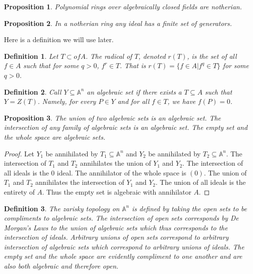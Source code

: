\documentclass{article}
\theoremstyle{problemstyle}
\newtheorem{definition}{Definition}
\newtheorem{proposition}{Proposition}
\begin{document}
\begin{proposition}
Polynomial rings over algebraically closed fields are notherian. 
\end{proposition}

\begin{proposition}
In a notherian ring any ideal has a finite set of generators. 
\end{proposition}

Here is a definition we will use later. 

\begin{definition}
Let $T \subset of A$. The radical of $T$, denoted $r(T)$, is the set of all $f \in A$ such that for some $q>0$, $f^r \in T$. That is $r(T) = \{f \in A | f^q \in T\}$ for some $q >0$.  
\end{definition}

\begin{definition}
Call $Y \subseteq \mathbb{A}^n$ an algebraic set if there exists a $T \subseteq A$ such that $Y = Z(T)$. Namely, for every $P \in Y$ and for all $f \in T$, we have $f(P) = 0$. 
\end{definition}

\begin{proposition}
The union of two algebraic sets is an algebraic set. The intersection of any family of algebraic sets is an algebraic set. The empty set and the whole space are algebraic sets. 
\end{proposition}

\begin{proof}
Let $Y_1$ be annihilated by $T_1 \subseteq \mathbb{A}^n$ and $Y_2$ be annihilated by $T_2 \subseteq \mathbb{A}^n$. The intersection of $T_1$ and $T_2$ annihilates the union of $Y_1$ and $Y_2$. The intersection of all ideals is the 0 ideal. The annihilator of the whole space is $(0)$.  The union of $T_1$ and $T_2$ annihilates the intersection of $Y_1$ and $Y_2$. The union of all ideals is the entirety of $A$. Thus the empty set is algebraic with annihilator $A$. 
\end{proof}

\begin{definition}
The zarisky topology on $\mathbb{A}^n$ is defined by taking the open sets to be compliments to algebraic sets. The intersection of open sets corresponds by De Morgan's Laws to the union of algebraic sets which thus corresponds to the intersection of ideals. Arbitrary unions of open sets correspond to arbitrary intersection of algebraic sets which correspond to arbitrary unions of ideals. The empty set and the whole space are evidently compliment to one another and are also both algebraic and therefore open.  
\end{definition}
\end{document}
